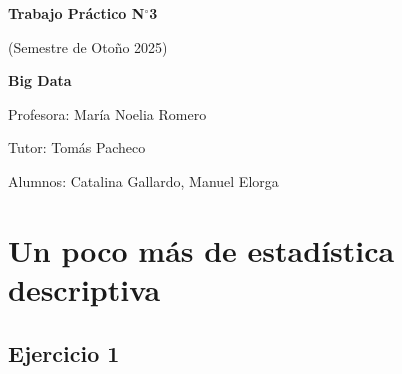 \documentclass[11pt,a4paper]{article}
\begin{document}
\begin{titlepage}
\centering
\vspace*{3cm}

{\LARGE\bfseries Trabajo Práctico N$^{\circ}$3\par}
\vspace{0.4cm}
{\large (Semestre de Otoño 2025)\par}
\vspace{0.3cm}
{\large\bfseries Big Data\par}

\vfill

{\large Profesora: María Noelia Romero\par}
\vspace{0.2cm}
{\large Tutor: Tomás Pacheco\par}
\vspace{0.2cm}
{\large Alumnos: Catalina Gallardo, Manuel Elorga\par}

\vfill
\end{titlepage}

\section{Un poco más de estadística descriptiva}

\subsection*{Ejercicio 1}
\end{document}
